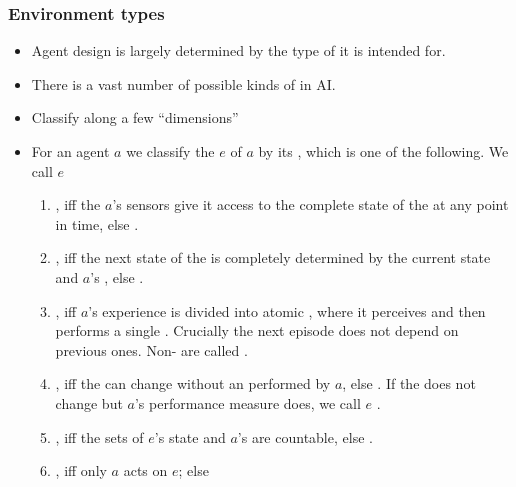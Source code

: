 \documentclass[notes,mh]{mikoslides}
\begin{document}
\begin{module}[id=envtypes]
\begin{frame}
  \frametitle{Environment types}
  \begin{itemize}
  \item 
    \begin{assertion}[type=observation]
      Agent design is largely determined by the type of  it
      is intended for. 
    \end{assertion}
  \item 
    \begin{omtext}[title=Problem]
      There is a vast number of possible kinds of  in AI.
    \end{omtext}
  \item 
    \begin{omtext}[title=Solution]
      Classify along a few ``dimensions'' 
    \end{omtext}
  \item 
    \begin{definition}
      For an agent $a$ we classify the  $e$ of $a$ by its
      , which is one of the following. We call $e$
      \begin{enumerate}
      \item {}, iff the $a$'s sensors give it access to the
        complete state of the  at any point in time, else
        .
      \item {}, iff the next state of the  is completely
        determined by the current state and $a$'s , else .
      \item {}, iff $a$'s experience is divided into atomic ,
        where it perceives and then performs a single
        . Crucially the next episode does not depend on previous
        ones. Non-  are called
        .
      \item {}, iff the  can change without an
         performed by $a$, else . If the
         does not change but $a$'s performance measure does,
        we call $e$ .
      \item {}, iff the sets of $e$'s state and $a$'s
         are countable, else .
      \item {}, iff only $a$ acts on $e$; else 
      \end{enumerate}
    \end{definition}
  \end{itemize}
\end{frame}


\end{module}
\end{document}
